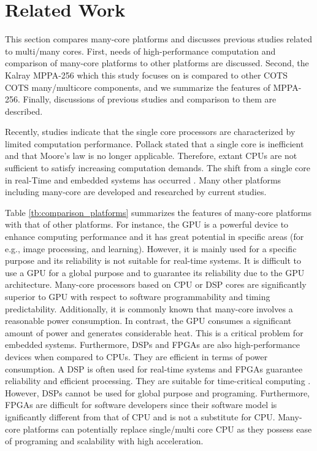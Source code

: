 \documentclass{sig-alternate-05-2015}
\begin{document}
\section{Related Work}
\label{sec:related work}
This section compares many-core platforms and discusses previous studies related to multi/many cores.
First, needs of high-performance computation and comparison of many-core platforms to other platforms are discussed.
Second, the Kalray MPPA-256 which this study focuses on is compared to other COTS COTS many/multicore components, and we summarize the features of MPPA-256.
Finally, discussions of previous studies and comparison to them are described.

Recently, studies indicate that the single core processors are characterized by limited computation performance.
Pollack stated that a single core is inefficient \cite{pollack1999new} and that Moore's law \cite{moore2006cramming} is no longer applicable. 
Therefore, extant CPUs are not sufficient to satisfy increasing computation demands.
The shift from a single core in real-Time and embedded systems has occurred \cite{saidi2015shift}. 
Many other platforms including many-core are developed and researched by current studies.

Table \ref{tb:comparison_platforms} summarizes the features of many-core platforms with that of other platforms.
For instance, the GPU is a powerful device to enhance computing performance and it has great potential in specific areas (for e.g., image processing, and learning).
However, it is mainly used for a specific purpose and its reliability is not suitable for real-time systems.
It is difficult to use a GPU for a global purpose and to guarantee its reliability due to the GPU architecture.
Many-core processors based on CPU or DSP cores are significantly superior to GPU with respect to software programmability and timing predictability.
Additionally, it is commonly known that many-core involves a reasonable power consumption.
In contrast, the GPU consumes a significant amount of power and generates considerable heat.
This is a critical problem for embedded systems.
Furthermore, DSPs and FPGAs are also high-performance devices when compared to CPUs.
They are efficient in terms of power consumption.
A DSP is often used for real-time systems and FPGAs guarantee reliability and efficient processing.
They are suitable for time-critical computing \cite{de2015kalray}.
However, DSPs cannot be used for global purpose and programing.
Furthermore, FPGAs are difficult for software developers since their software model is ignificantly different from that of CPU and is not a substitute for CPU.
Many-core platforms can potentially replace single/multi core CPU as they possess ease of programing and scalability with high acceleration.
\end{document}
